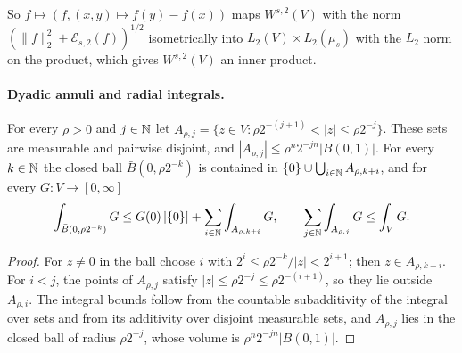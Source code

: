 So $f \mapsto (f, (x, y) \mapsto f(y) - f(x))$ maps $W^{s,2}(V)$ with the norm
$(\|f\|_2^2 + \mathcal{E}_{s,2}(f))^{1/2}$ isometrically into $L_2(V) \times L_2(\mu_s)$ with the
$L_2$ norm on the product, which gives $W^{s,2}(V)$ an inner product.

\paragraph{Dyadic annuli and radial integrals.}

\begin{lemma}
\label{lem:dyadic-annuli}
\leanok
{}
For every $\rho > 0$ and $j \in \mathbb{N}$ let
$A_{\rho, j} = \{ z \in V : \rho 2^{-(j+1)} < |z| \leq \rho 2^{-j} \}$. These sets are
measurable and pairwise disjoint, and $|A_{\rho, j}| \leq \rho^n 2^{-jn} |B(0, 1)|$. For every
$k \in \mathbb{N}$ the closed ball $\bar B(0, \rho 2^{-k})$ is contained in
$\{0\} \cup \bigcup_{i \in \mathbb{N}} A_{\rho, k + i}$, and for every $G \colon V \to [0, \infty]$
\[
  \int_{\bar B(0, \rho 2^{-k})} G \leq G(0) \, |\{0\}| + \sum_{i \in \mathbb{N}} \int_{A_{\rho, k+i}} G ,
  \qquad
  \sum_{j \in \mathbb{N}} \int_{A_{\rho, j}} G \leq \int_V G .
\]
\end{lemma}

\begin{proof}
\leanok
For $z \neq 0$ in the ball choose $i$ with $2^i \leq \rho 2^{-k} / |z| < 2^{i+1}$; then
$z \in A_{\rho, k+i}$. For $i < j$, the points of $A_{\rho, j}$ satisfy
$|z| \leq \rho 2^{-j} \leq \rho 2^{-(i+1)}$, so they lie outside $A_{\rho, i}$. The integral
bounds follow from the countable subadditivity of the integral over sets and from its
additivity over disjoint measurable sets, and $A_{\rho, j}$ lies in the closed ball of radius
$\rho 2^{-j}$, whose volume is $\rho^n 2^{-jn} |B(0, 1)|$.
\end{proof}

